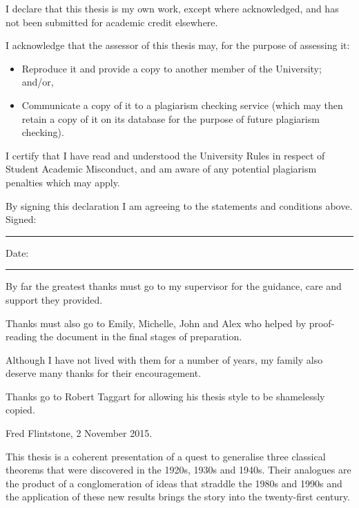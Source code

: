 \beforepreface

\afterpage{\blankpage}



\vskip 10pc \noindent I declare that this thesis is my
own work, except where acknowledged, and has not been submitted for
academic credit elsewhere. 

\vskip 2pc  \noindent I acknowledge that the assessor of this
thesis may, for the purpose of assessing it:
\begin{itemize}
\item Reproduce it and provide a copy to another member of the University; and/or,
\item Communicate a copy of it to a plagiarism checking service (which may then retain a copy of it on its database for the purpose of future plagiarism checking).
\end{itemize}

\vskip 2pc \noindent I certify that I have read and understood the University Rules in
respect of Student Academic Misconduct, and am aware of any potential plagiarism penalties which may 
apply.\vspace{24pt}

\vskip 2pc \noindent By signing this declaration I am agreeing to the statements and conditions above.
\vskip 2pc
Signed: \rule{7cm}{0.25pt} \hfill Date: \rule{4cm}{0.25pt}

\afterpage{\blankpage}




{\bigskip}By far the greatest thanks must go to my supervisor for
the guidance, care and support they provided. 

{\bigskip\noindent}Thanks must also go to Emily, Michelle, John and Alex who helped by
proof-reading the document in the final stages of preparation.

{\bigskip\noindent}Although I have not lived with them for a number of years, my family also deserve many thanks for their encouragement.

{\bigskip\noindent} Thanks go to Robert Taggart for allowing his thesis style to be shamelessly copied.

{\bigskip\bigskip\bigskip\noindent} Fred Flintstone, 2 November 2015.

\afterpage{\blankpage}



This thesis is a coherent presentation of a quest to generalise three classical
theorems that were discovered in the 1920s, 1930s and 1940s. Their analogues are
the product of a conglomeration of ideas that straddle the 1980s and 1990s and
the application of these new results brings the story into the twenty-first
century.
\afterpage{\blankpage}


\afterpreface